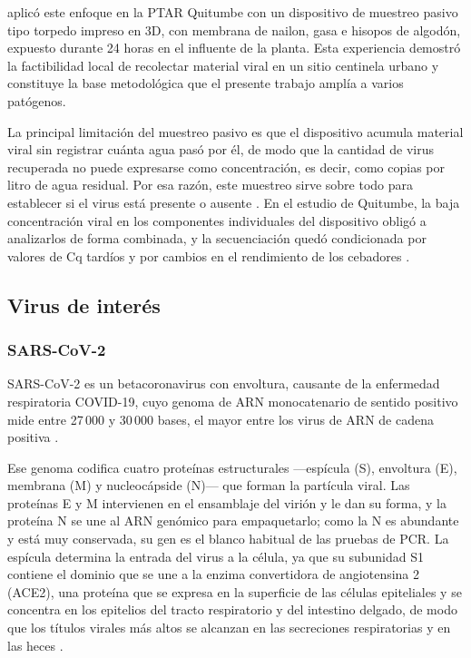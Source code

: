  aplicó este enfoque en la PTAR Quitumbe con un dispositivo de muestreo pasivo tipo torpedo impreso en 3D, con membrana de nailon, gasa e hisopos de algodón, expuesto durante 24 horas en el influente de la planta. Esta experiencia demostró la factibilidad local de recolectar material viral en un sitio centinela urbano y constituye la base metodológica que el presente trabajo amplía a varios patógenos.

La principal limitación del muestreo pasivo es que el dispositivo acumula material viral sin registrar cuánta agua pasó por él, de modo que la cantidad de virus recuperada no puede expresarse como concentración, es decir, como copias por litro de agua residual. Por esa razón, este muestreo sirve sobre todo para establecer si el virus está presente o ausente \cite{Parkins_2023}. En el estudio de Quitumbe, la baja concentración viral en los componentes individuales del dispositivo obligó a analizarlos de forma combinada, y la secuenciación quedó condicionada por valores de Cq tardíos y por cambios en el rendimiento de los cebadores \cite{MejiaCalle_2024}. 

\subsection{Virus de interés}

\subsubsection{SARS-CoV-2}

SARS-CoV-2 es un betacoronavirus con envoltura, causante de la enfermedad respiratoria COVID-19, cuyo genoma de ARN monocatenario de sentido positivo mide entre 27\,000 y 30\,000 bases, el mayor entre los virus de ARN de cadena positiva \cite{Murray_2021}.

Ese genoma codifica cuatro proteínas estructurales —espícula (S), envoltura (E), membrana (M) y nucleocápside (N)— que forman la partícula viral. Las proteínas E y M intervienen en el ensamblaje del virión y le dan su forma, y la proteína N se une al ARN genómico para empaquetarlo; como la N es abundante y está muy conservada, su gen es el blanco habitual de las pruebas de PCR. La espícula determina la entrada del virus a la célula, ya que su subunidad S1 contiene el dominio que se une a la enzima convertidora de angiotensina 2 (ACE2), una proteína que se expresa en la superficie de las células epiteliales y se concentra en los epitelios del tracto respiratorio y del intestino delgado, de modo que los títulos virales más altos se alcanzan en las secreciones respiratorias y en las heces \cite{deMelo_2026}.

